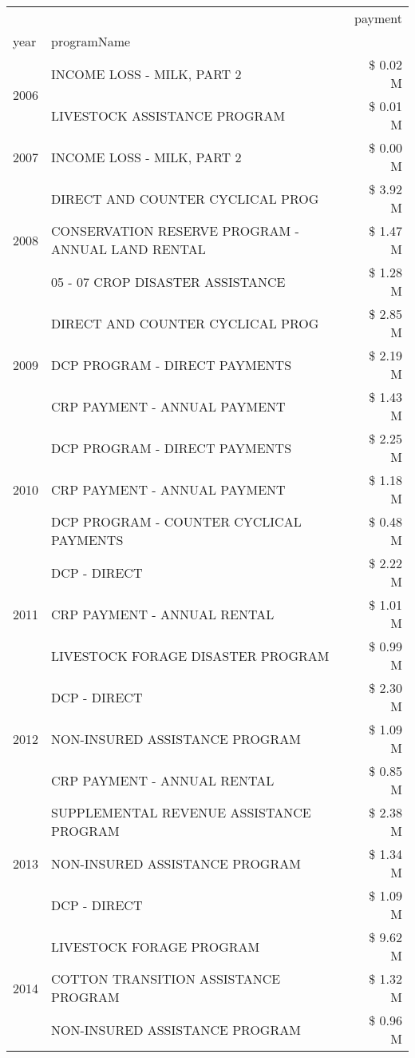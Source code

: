 \begin{tabular}{llr}
\toprule
 &  & payment \\
year & programName &  \\
\midrule
\multirow[t]{2}{*}{2006} & INCOME LOSS - MILK, PART 2 & \$ 0.02 M \\
 & LIVESTOCK ASSISTANCE PROGRAM & \$ 0.01 M \\
\cline{1-3}
2007 & INCOME LOSS - MILK, PART 2 & \$ 0.00 M \\
\cline{1-3}
\multirow[t]{3}{*}{2008} & DIRECT AND COUNTER CYCLICAL PROG & \$ 3.92 M \\
 & CONSERVATION RESERVE PROGRAM - ANNUAL LAND RENTAL & \$ 1.47 M \\
 & 05 - 07 CROP DISASTER ASSISTANCE & \$ 1.28 M \\
\cline{1-3}
\multirow[t]{3}{*}{2009} & DIRECT AND COUNTER CYCLICAL PROG & \$ 2.85 M \\
 & DCP PROGRAM - DIRECT PAYMENTS & \$ 2.19 M \\
 & CRP PAYMENT - ANNUAL PAYMENT & \$ 1.43 M \\
\cline{1-3}
\multirow[t]{3}{*}{2010} & DCP PROGRAM - DIRECT PAYMENTS & \$ 2.25 M \\
 & CRP PAYMENT - ANNUAL PAYMENT & \$ 1.18 M \\
 & DCP PROGRAM - COUNTER CYCLICAL PAYMENTS & \$ 0.48 M \\
\cline{1-3}
\multirow[t]{3}{*}{2011} & DCP - DIRECT & \$ 2.22 M \\
 & CRP PAYMENT - ANNUAL RENTAL & \$ 1.01 M \\
 & LIVESTOCK FORAGE DISASTER PROGRAM & \$ 0.99 M \\
\cline{1-3}
\multirow[t]{3}{*}{2012} & DCP - DIRECT & \$ 2.30 M \\
 & NON-INSURED ASSISTANCE PROGRAM & \$ 1.09 M \\
 & CRP PAYMENT - ANNUAL RENTAL & \$ 0.85 M \\
\cline{1-3}
\multirow[t]{3}{*}{2013} & SUPPLEMENTAL REVENUE ASSISTANCE PROGRAM & \$ 2.38 M \\
 & NON-INSURED ASSISTANCE PROGRAM & \$ 1.34 M \\
 & DCP - DIRECT & \$ 1.09 M \\
\cline{1-3}
\multirow[t]{3}{*}{2014} & LIVESTOCK FORAGE PROGRAM & \$ 9.62 M \\
 & COTTON TRANSITION ASSISTANCE PROGRAM & \$ 1.32 M \\
 & NON-INSURED ASSISTANCE PROGRAM & \$ 0.96 M \\
\cline{1-3}

\end{tabular}
